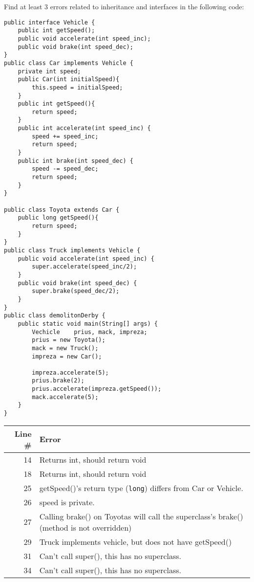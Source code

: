%
%


Find at least 3 errors related to inheritance and interfaces in the following code:\label{demolition-derby}
\begin{lstlisting}
public interface Vehicle {
	public int getSpeed();
	public void accelerate(int speed_inc);
	public void brake(int speed_dec);
}
public class Car implements Vehicle {
	private int speed;
	public Car(int initialSpeed){
		this.speed = initialSpeed;
	}
	public int getSpeed(){
		return speed;
	}
	public int accelerate(int speed_inc) {
		speed += speed_inc;
		return speed;
	}
	public int brake(int speed_dec) {
		speed -= speed_dec;
		return speed;
	}
}

public class Toyota extends Car {
	public long getSpeed(){
		return speed;
	}
}
public class Truck implements Vehicle {
	public void accelerate(int speed_inc) {
		super.accelerate(speed_inc/2);
	}
	public void brake(int speed_dec) {
		super.brake(speed_dec/2);
	}
}
public class demolitonDerby {
	public static void main(String[] args) {
		Vechicle	prius, mack, impreza;
		prius = new Toyota();
		mack = new Truck();
		impreza = new Car();
		
		impreza.accelerate(5);
		prius.brake(2);
		prius.accelerate(impreza.getSpeed());
		mack.accelerate(5);
	}
}
\end{lstlisting}

\begin{answer}
    \begin{tabular}{r l} %
    Line \# & Error \\\hline
    14  	& Returns int, should return void\\
    18  	& Returns int, should return void\\
    25  	& getSpeed()'s return type ({\tt long}) differs from Car or Vehicle.\\
    26  	& speed is private.\\
    27		& Calling brake() on Toyotas will call the superclass's brake() (method is not overridden)\\
    29  	& Truck implements vehicle, but does not have getSpeed()\\
    31  	& Can't call super(), this has no superclass.\\
    34  	& Can't call super(), this has no superclass.\\
    \end{tabular}
\end{answer}
